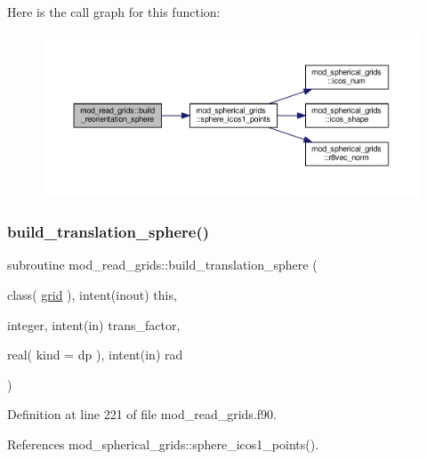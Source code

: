 Here is the call graph for this function\+:
\nopagebreak
\begin{figure}[H]
\begin{center}
\leavevmode
\includegraphics[width=350pt]{namespacemod__read__grids_aa9f66d2873344e2a319f7eddb09df558_cgraph}
\end{center}
\end{figure}
\mbox{\label{namespacemod__read__grids_a4285bde2d44b92f9fcc792dfeebb1eae}} 
\subsubsection{\texorpdfstring{build\+\_\+translation\+\_\+sphere()}{build\_translation\_sphere()}}
{\footnotesize\ttfamily subroutine mod\+\_\+read\+\_\+grids\+::build\+\_\+translation\+\_\+sphere (\begin{DoxyParamCaption}\item[{class( \hyperlink{structmod__read__grids_1_1grid}{grid} ), intent(inout)}]{this,  }\item[{integer, intent(in)}]{trans\+\_\+factor,  }\item[{real( kind = dp ), intent(in)}]{rad }\end{DoxyParamCaption})}



Definition at line 221 of file mod\+\_\+read\+\_\+grids.\+f90.



References mod\+\_\+spherical\+\_\+grids\+::sphere\+\_\+icos1\+\_\+points().

